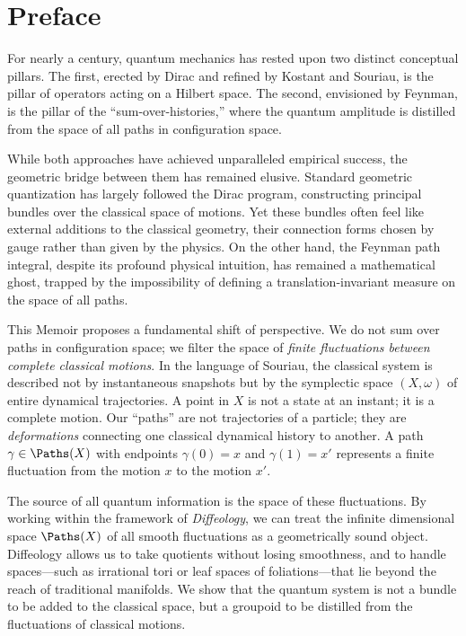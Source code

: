 
\chapter*{Preface}

For nearly a century,
quantum mechanics has rested upon two distinct conceptual pillars.
The first,
erected by Dirac and refined by Kostant and Souriau,
is the pillar of operators acting on a Hilbert space.
The second,
envisioned by Feynman,
is the pillar of the ``sum-over-histories,''
where the quantum amplitude is distilled from the space of all paths in configuration space.

While both approaches have achieved unparalleled empirical success,
the geometric bridge between them has remained elusive.
Standard geometric quantization has largely followed the Dirac program,
constructing principal bundles over the classical space of motions.
Yet these bundles often feel like external additions to the classical geometry,
their connection forms chosen by gauge rather than given by the physics.
On the other hand,
the Feynman path integral,
despite its profound physical intuition,
has remained a mathematical ghost,
trapped by the impossibility of defining a translation-invariant measure on the space of all paths.

This Memoir proposes a fundamental shift of perspective.
We do not sum over paths in configuration space;
we filter the space of \emph{finite fluctuations between complete classical motions}.
In the language of Souriau,
the classical system is described not by instantaneous snapshots
but by the symplectic space $(X,\omega)$ of entire dynamical trajectories.
A point in $X$ is not a state at an instant;
it is a complete motion.
Our ``paths'' are not trajectories of a particle;
they are \emph{deformations} connecting one classical dynamical history to another.
A path $\gamma \in \Paths(X)$ with endpoints $\gamma(0) = x$ and $\gamma(1) = x'$
represents a finite fluctuation from the motion $x$ to the motion $x'$.

The source of all quantum information is the space of these fluctuations.
By working within the framework of \emph{Diffeology},
we can treat the infinite dimensional space $\Paths(X)$ of all smooth fluctuations as a geometrically sound object.
Diffeology allows us to take quotients without losing smoothness,
and to handle spaces---such as irrational tori or leaf spaces of foliations---that lie beyond the reach of traditional manifolds.
We show that the quantum system is not a bundle to be added to the classical space,
but a groupoid to be distilled from the fluctuations of classical motions.

